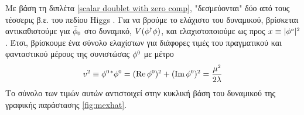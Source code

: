 Με βάση τη 
διπλέτα \eqref{scalar doublet with zero comp}, "δεσμεύονται" δύο από τους τέσσερις β.ε. του πεδίου Higgs \cite{itzykson2012quantum}. 
Για να βρούμε το ελάχιστο του δυναμικού, βρίσκεται αντικαθιστούμε για $\Bar{\phi}\subscr{0}$ στο δυναμικό, $V(\phi\superscr{\dagger}\phi)$, και ελαχιστοποιούμε
ως προς $x\equiv|\phi\superscr{o}|\superscr{2}$. Έτσι, βρίσκουμε ένα σύνολο ελαχίστων για διάφορες τιμές του πραγματικού και φανταστικού μέρους της συνιστώσας $\phi\superscr{0}$ με μέτρο
\begin{equation}           v\superscr{2}\equiv\phi\superscr{0\,*}\phi\superscr{0}=(\operatorname{Re}\phi\superscr{0})\superscr{2}+(\operatorname{Im}\phi\superscr{0})\superscr{2}=\frac{\mu\superscr{2}}{2\lambda}
\end{equation}
Το σύνολο των τιμών αυτών αντιστοιχεί στην κυκλική βάση του δυναμικού της γραφικής παράστασης \ref{fig:mexhat}.\\

